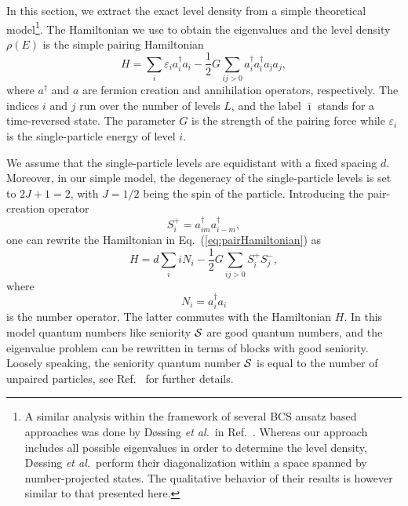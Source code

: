 In this section, we extract the exact level density from a simple theoretical model\footnote{A similar analysis within the framework of several BCS ansatz based approaches was done by D{\o}ssing {\sl et al.}~in Ref.\ \cite{7}. Whereas our approach includes all possible eigenvalues in order to determine the level density, D{\o}ssing {\sl et al.}~perform their diagonalization within a space spanned by number-projected states. The qualitative behavior of their results is however similar to that presented here.}. The Hamiltonian we use to obtain the eigenvalues and the level density  $\rho(E)$ is the simple pairing Hamiltonian 
\begin{equation}
   H=\sum_i \varepsilon_i a^{\dagger}_i a_i -\frac{1}{2} G\sum_{ij>0}
           a^{\dagger}_{i}
     a^{\dagger}_{\bar{\imath}}a_{\bar{\jmath}}a_{j},
     \label{eq:pairHamiltonian}
\end{equation}
where $a^{\dagger}$ and $a$ are fermion creation and annihilation operators, respectively. The indices $i$ and $j$ run over the number of levels $L$, and the label $\bar{\imath}$ stands for a time-reversed state. The parameter $G$ is the strength of the pairing force while $\varepsilon_i$ is the single-particle energy of level $i$. 

We assume that the single-particle levels are equidistant with a fixed spacing $d$.
Moreover, in our simple model, the degeneracy of the single-particle levels is set to $2J+1=2$, with $J=1/2$ being the spin of the particle. 
Introducing the pair-creation operator 
\begin{equation}
   S^+_i=a^{\dagger}_{im}a^{\dagger}_{i-m},
\end{equation}
one can rewrite the Hamiltonian in Eq.\ (\ref{eq:pairHamiltonian}) as
\begin{equation}
   H=d\sum_iiN_i
     -\frac{1}{2} G\sum_{ij>0}S^+_iS^-_j,
     \label{eq:pair2}
\end{equation}
where  
\begin{equation}
   N_i=a^{\dagger}_i a_i
\end{equation}
is the number operator. The latter commutes with the Hamiltonian $H$. In this model quantum numbers like seniority $\cal{S}$ are good quantum numbers, and the eigenvalue problem can be rewritten in terms of blocks with good seniority. Loosely speaking, the seniority quantum number $\cal{S}$ is equal to the number of unpaired particles, see Ref.\ \cite{talmi93} for further details. 


